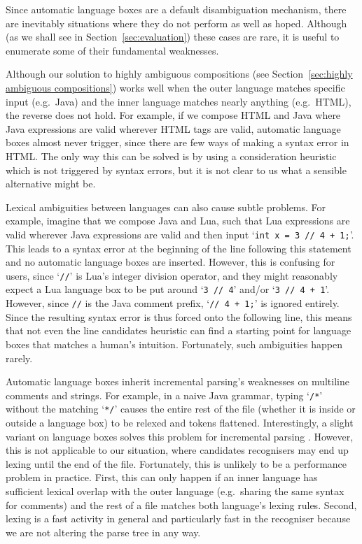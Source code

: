 \documentclass[sigplan,screen]{acmart}\settopmatter{printfolios=true,printccs=false,printacmref=false}
\begin{document}
Since automatic language boxes are a default disambiguation mechanism,
there are inevitably situations where they do not perform as well as hoped.
Although (as we shall see in Section~\ref{sec:evaluation}) these cases are
rare, it is useful to enumerate some of their fundamental weaknesses.

Although our solution to highly ambiguous compositions (see Section~\ref{sec:highly
ambiguous compositions}) works well when the outer language matches specific
input (e.g.~Java) and the inner language matches nearly anything (e.g.~HTML),
the reverse does not hold. For example, if we compose HTML and Java where
Java expressions are valid wherever HTML tags are valid, automatic language
boxes almost never trigger, since there are few ways of making a syntax error
in HTML. The only way this can be solved is by using a consideration
heuristic which is not triggered by syntax errors, but it is not clear to
us what a sensible alternative might be.

Lexical ambiguities between languages can also cause subtle problems. For
example, imagine that we compose Java and Lua, such that Lua expressions are
valid wherever Java expressions are valid and then input `\texttt{int x = 3 //
4 + 1;}'. This leads to a syntax error at the beginning of the line following
this statement and no automatic language boxes are inserted. However, this is
confusing for users, since `\texttt{//}' is Lua's integer division operator,
and they might reasonably expect a Lua language box to be put around `\texttt{3
// 4}' and/or `\texttt{3 // 4 + 1}'. However, since \texttt{//} is the Java
comment prefix, `\texttt{// 4 + 1;}' is ignored entirely. Since the resulting
syntax error is thus forced onto the following line, this means that not even
the line candidates heuristic can find a starting point for language boxes that
matches a human's intuition. Fortunately, such ambiguities happen
rarely.

Automatic language boxes inherit incremental parsing's weaknesses on multiline
comments and strings. For example, in a naive Java grammar, typing
`\texttt{/*}' without the matching `\texttt{*/}' causes the entire rest of the
file (whether it is inside or outside a language box) to be relexed and tokens
flattened. Interestingly, a slight variant on language boxes solves this problem
for incremental parsing \cite[p.~108--122]{diekmann18editing}.
However, this is not applicable to our situation, where candidates
recognisers may end up lexing until the end of the file. Fortunately, this is
unlikely to be a performance problem in practice. First, this can only happen
if an inner language has sufficient lexical overlap with the outer language
(e.g.~sharing the same syntax for comments) and the rest of a file matches both
language's lexing rules.  Second, lexing is a fast activity in general and
particularly fast in the recogniser because we are not altering the parse tree
in any way.
\end{document}
